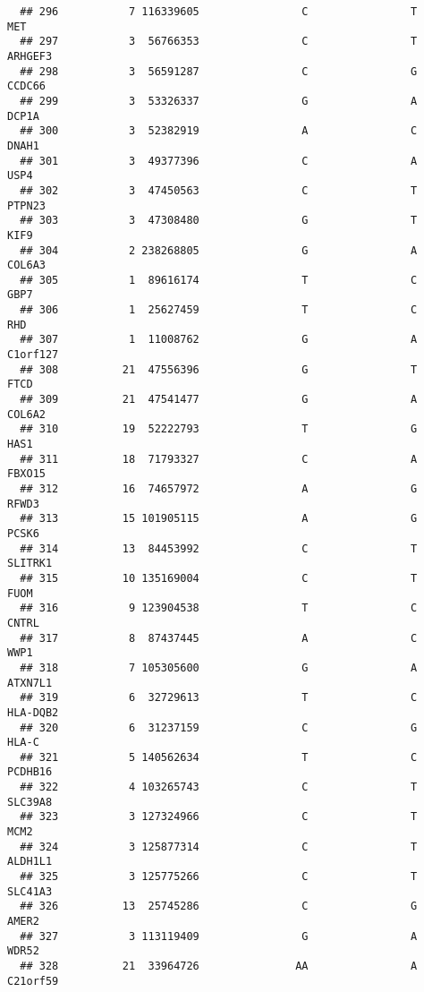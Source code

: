 \documentclass[12pt,twoside]{reedthesis}
\theoremstyle{definition}
\theoremstyle{definition}
\theoremstyle{remark}
\begin{document}
\begin{verbatim}
  ## 296           7 116339605                C                T            MET
  ## 297           3  56766353                C                T        ARHGEF3
  ## 298           3  56591287                C                G         CCDC66
  ## 299           3  53326337                G                A          DCP1A
  ## 300           3  52382919                A                C          DNAH1
  ## 301           3  49377396                C                A           USP4
  ## 302           3  47450563                C                T         PTPN23
  ## 303           3  47308480                G                T           KIF9
  ## 304           2 238268805                G                A         COL6A3
  ## 305           1  89616174                T                C           GBP7
  ## 306           1  25627459                T                C            RHD
  ## 307           1  11008762                G                A       C1orf127
  ## 308          21  47556396                G                T           FTCD
  ## 309          21  47541477                G                A         COL6A2
  ## 310          19  52222793                T                G           HAS1
  ## 311          18  71793327                C                A         FBXO15
  ## 312          16  74657972                A                G          RFWD3
  ## 313          15 101905115                A                G          PCSK6
  ## 314          13  84453992                C                T        SLITRK1
  ## 315          10 135169004                C                T           FUOM
  ## 316           9 123904538                T                C          CNTRL
  ## 317           8  87437445                A                C           WWP1
  ## 318           7 105305600                G                A        ATXN7L1
  ## 319           6  32729613                T                C       HLA-DQB2
  ## 320           6  31237159                C                G          HLA-C
  ## 321           5 140562634                T                C        PCDHB16
  ## 322           4 103265743                C                T        SLC39A8
  ## 323           3 127324966                C                T           MCM2
  ## 324           3 125877314                C                T        ALDH1L1
  ## 325           3 125775266                C                T        SLC41A3
  ## 326          13  25745286                C                G          AMER2
  ## 327           3 113119409                G                A          WDR52
  ## 328          21  33964726               AA                A       C21orf59

\end{verbatim}
\end{document}

